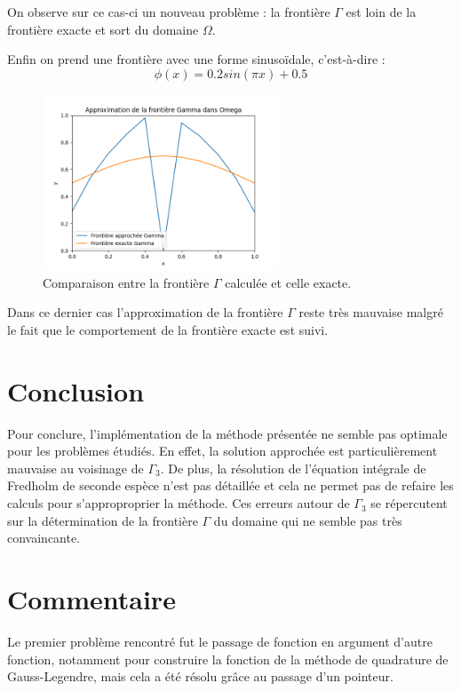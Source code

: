 \documentclass{article}
\begin{document}
\vspace{1cm}

On observe sur ce cas-ci un nouveau problème : la frontière $\Gamma$ est loin de la frontière exacte et sort du domaine $\Omega$.


Enfin on prend une frontière avec une forme sinusoïdale, c'est-à-dire :
\begin{equation}
    \phi(x) = 0.2sin(\pi x) + 0.5
\end{equation}
\begin{figure}[h]
    \centering
    \includegraphics[width=7cm]{frontiere_Gamma_sinus.png}
    \caption{Comparaison entre la frontière $\Gamma$ calculée et celle exacte.}
    \label{fig:enter-label}
\end{figure}

Dans ce dernier cas l'approximation de la frontière $\Gamma$ reste très mauvaise malgré le fait que le comportement de la frontière exacte est suivi.
\section{Conclusion}
Pour conclure, l'implémentation de la méthode présentée ne semble pas optimale pour les problèmes étudiés. En effet, la solution approchée est particulièrement mauvaise au voisinage de $\Gamma_3$. De plus, la résolution de l'équation intégrale de Fredholm de seconde espèce n'est pas détaillée et cela ne permet pas de refaire les calculs pour s'approproprier la méthode.
Ces erreurs autour de $\Gamma_3$ se répercutent sur la détermination de la frontière $\Gamma$ du domaine qui ne semble pas très convaincante.


\section{Commentaire}
Le premier problème rencontré fut le passage de fonction en argument d'autre fonction, notamment pour construire la fonction de la méthode de quadrature de Gauss-Legendre, mais cela a été résolu grâce au passage d'un pointeur.
\end{document}
